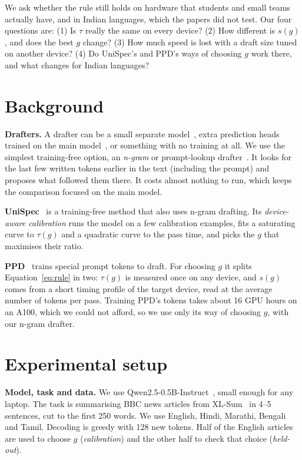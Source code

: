 \documentclass{article}
\begin{document}
We ask whether the rule still holds on hardware that students and small teams actually have, and in Indian languages, which the papers did not test.
Our four questions are:
(1) Is $\tau$ really the same on every device?
(2) How different is $s(g)$, and does the best $g$ change?
(3) How much speed is lost with a draft size tuned on another device?
(4) Do UniSpec's and PPD's ways of choosing $g$ work there, and what changes for Indian languages?

\section{Background}

\textbf{Drafters.}
A drafter can be a small separate model~\citep{leviathan}, extra prediction heads trained on the main model~\citep{medusa, eagle}, or something with no training at all.
We use the simplest training-free option, an \emph{n-gram} or prompt-lookup drafter~\citep{pld}.
It looks for the last few written tokens earlier in the text (including the prompt) and proposes what followed them there.
It costs almost nothing to run, which keeps the comparison focused on the main model.

\textbf{UniSpec}~\citep{unispec} is a training-free method that also uses n-gram drafting.
Its \emph{device-aware calibration} runs the model on a few calibration examples, fits a saturating curve to $\tau(g)$ and a quadratic curve to the pass time, and picks the $g$ that maximises their ratio.

\textbf{PPD}~\citep{ppd} trains special prompt tokens to draft.
For choosing $g$ it splits Equation~\ref{eq:rule} in two: $\tau(g)$ is measured once on any device, and $s(g)$ comes from a short timing profile of the target device, read at the average number of tokens per pass.
Training PPD's tokens takes about 16 GPU hours on an A100, which we could not afford, so we use only its way of choosing $g$, with our n-gram drafter.

\section{Experimental setup}

\textbf{Model, task and data.}
We use Qwen2.5-0.5B-Instruct~\citep{qwen}, small enough for any laptop.
The task is summarising BBC news articles from XL-Sum~\citep{xlsum} in 4--5 sentences, cut to the first 250 words.
We use English, Hindi, Marathi, Bengali and Tamil.
Decoding is greedy with 128 new tokens.
Half of the English articles are used to choose $g$ (\emph{calibration}) and the other half to check that choice (\emph{held-out}).
\end{document}
